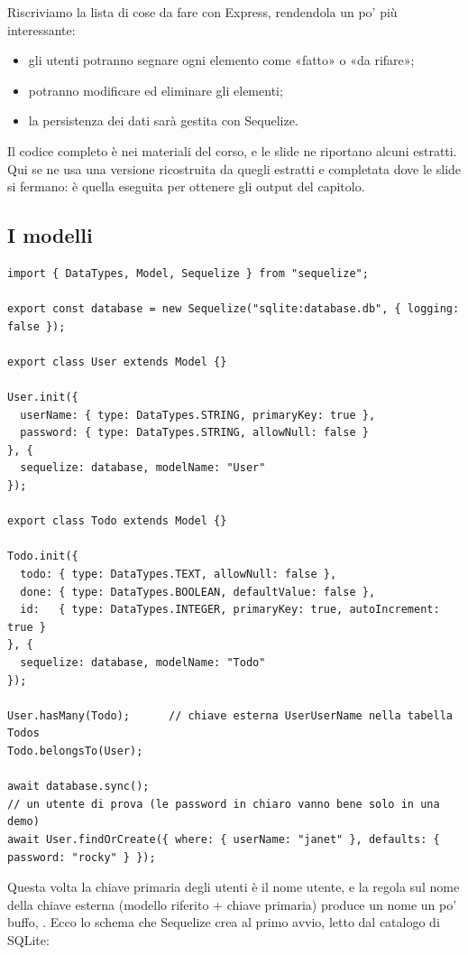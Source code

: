 Riscriviamo la lista di cose da fare con Express, rendendola un po' più
interessante:

\begin{itemize}
  \item gli utenti potranno segnare ogni elemento come «fatto» o «da rifare»;
  \item potranno modificare ed eliminare gli elementi;
  \item la persistenza dei dati sarà gestita con Sequelize.
\end{itemize}

Il codice completo è nei materiali del corso, e le slide ne riportano alcuni
estratti. Qui se ne usa una versione ricostruita da quegli estratti e completata
dove le slide si fermano: è quella eseguita per ottenere gli output del
capitolo.

\subsection{I modelli}

\begin{lstlisting}[style=js, name=models/Database.js]
import { DataTypes, Model, Sequelize } from "sequelize";

export const database = new Sequelize("sqlite:database.db", { logging: false });

export class User extends Model {}

User.init({
  userName: { type: DataTypes.STRING, primaryKey: true },
  password: { type: DataTypes.STRING, allowNull: false }
}, {
  sequelize: database, modelName: "User"
});

export class Todo extends Model {}

Todo.init({
  todo: { type: DataTypes.TEXT, allowNull: false },
  done: { type: DataTypes.BOOLEAN, defaultValue: false },
  id:   { type: DataTypes.INTEGER, primaryKey: true, autoIncrement: true }
}, {
  sequelize: database, modelName: "Todo"
});

User.hasMany(Todo);      // chiave esterna UserUserName nella tabella Todos
Todo.belongsTo(User);

await database.sync();
// un utente di prova (le password in chiaro vanno bene solo in una demo)
await User.findOrCreate({ where: { userName: "janet" }, defaults: { password: "rocky" } });
\end{lstlisting}

Questa volta la chiave primaria degli utenti è il nome utente, e la regola sul
nome della chiave esterna (modello riferito + chiave primaria) produce un nome
un po' buffo, . Ecco lo schema che Sequelize crea al primo
avvio, letto dal catalogo di SQLite:

